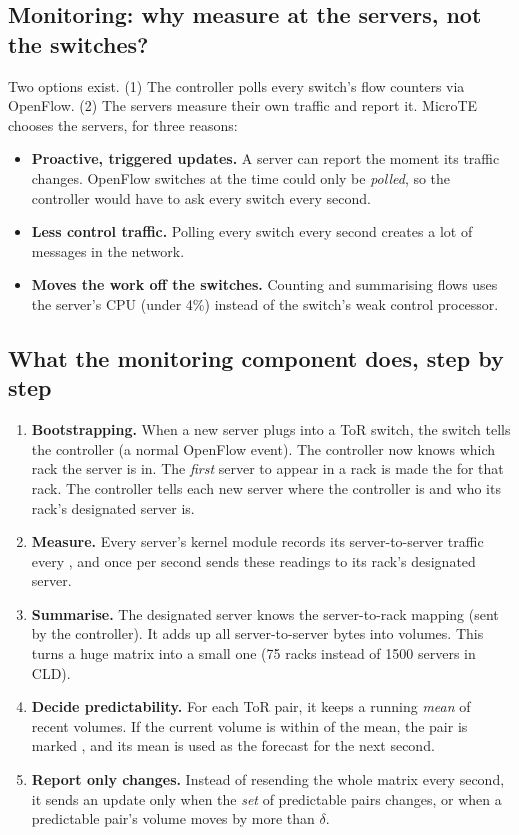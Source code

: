 \subsection{Monitoring: why measure at the servers, not the switches?}
Two options exist. (1) The controller polls every switch's flow counters via OpenFlow. (2) The servers measure their own traffic and report it.
MicroTE chooses the servers, for three reasons:
\begin{itemize}
  \item \textbf{Proactive, triggered updates.} A server can report the moment its traffic changes. OpenFlow switches at the time could only be
        \emph{polled}, so the controller would have to ask every switch every second.
  \item \textbf{Less control traffic.} Polling every switch every second creates a lot of messages in the network.
  \item \textbf{Moves the work off the switches.} Counting and summarising flows uses the server's CPU (under 4\%) instead of the switch's weak
        control processor.
\end{itemize}

\subsection{What the monitoring component does, step by step}
\begin{enumerate}
  \item \textbf{Bootstrapping.} When a new server plugs into a ToR switch, the switch tells the controller (a normal OpenFlow event). The
        controller now knows which rack the server is in. The \emph{first} server to appear in a rack is made the 
        for that rack. The controller tells each new server where the controller is and who its rack's designated server is.
  \item \textbf{Measure.} Every server's kernel module records its server-to-server traffic every , and once per second sends these
        readings to its rack's designated server.
  \item \textbf{Summarise.} The designated server knows the server-to-rack mapping (sent by the controller). It adds up all server-to-server
        bytes into  volumes. This turns a huge matrix into a small one (75 racks instead of 1500 servers in CLD).
  \item \textbf{Decide predictability.} For each ToR pair, it keeps a running \emph{mean} of recent volumes. If the current volume is within
         of the mean, the pair is marked , and its mean is used as the forecast for the next second.
  \item \textbf{Report only changes.} Instead of resending the whole matrix every second, it sends an update only when the \emph{set} of
        predictable pairs changes, or when a predictable pair's volume moves by more than $\delta$.
\end{enumerate}

